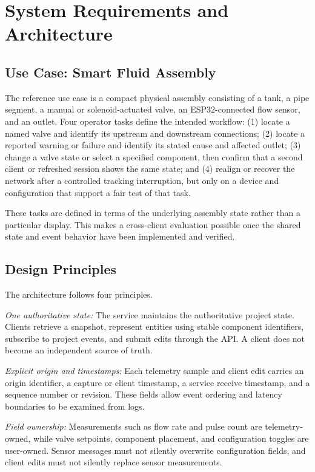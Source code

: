 \documentclass[conference]{IEEEtran}
\begin{document}
\section{System Requirements and Architecture}
\subsection{Use Case: Smart Fluid Assembly}
The reference use case is a compact physical assembly consisting of a tank, a pipe segment, a manual or solenoid-actuated valve, an ESP32-connected flow sensor, and an outlet. Four operator tasks define the intended workflow: (1) locate a named valve and identify its upstream and downstream connections; (2) locate a reported warning or failure and identify its stated cause and affected outlet; (3) change a valve state or select a specified component, then confirm that a second client or refreshed session shows the same state; and (4) realign or recover the network after a controlled tracking interruption, but only on a device and configuration that support a fair test of that task.

These tasks are defined in terms of the underlying assembly state rather than a particular display. This makes a cross-client evaluation possible once the shared state and event behavior have been implemented and verified.

\subsection{Design Principles}
The architecture follows four principles.

\textit{One authoritative state:} The service maintains the authoritative project state. Clients retrieve a snapshot, represent entities using stable component identifiers, subscribe to project events, and submit edits through the API. A client does not become an independent source of truth.

\textit{Explicit origin and timestamps:} Each telemetry sample and client edit carries an origin identifier, a capture or client timestamp, a service receive timestamp, and a sequence number or revision. These fields allow event ordering and latency boundaries to be examined from logs.

\textit{Field ownership:} Measurements such as flow rate and pulse count are telemetry-owned, while valve setpoints, component placement, and configuration toggles are user-owned. Sensor messages must not silently overwrite configuration fields, and client edits must not silently replace sensor measurements.
\end{document}
